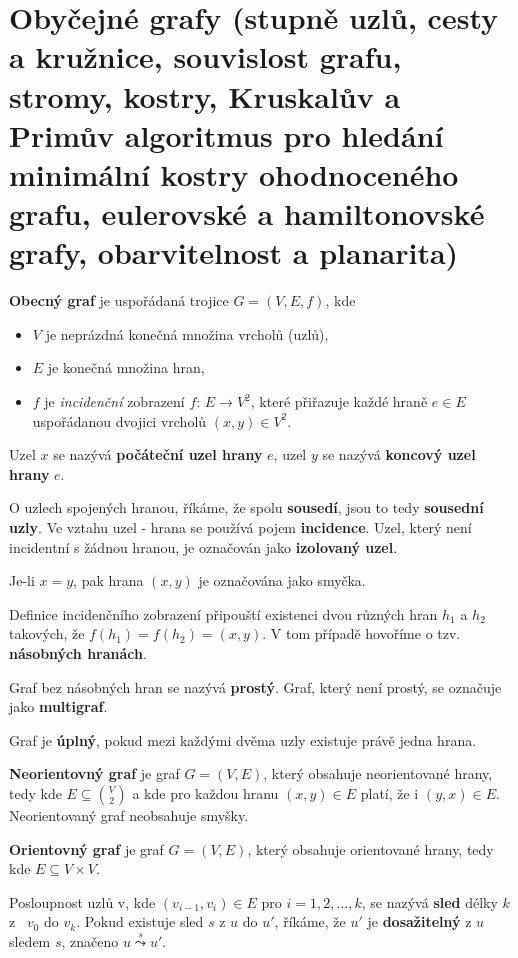 \documentclass[11pt,a4paper]{article}
\begin{document}
\section{Obyčejné grafy (stupně uzlů, cesty a kružnice, souvislost grafu, stromy, kostry, Kruskalův a Primův algoritmus pro hledání minimální kostry ohodnoceného grafu, eulerovské a hamiltonovské grafy, obarvitelnost a planarita)}

\textbf{Obecný graf} je uspořádaná trojice $G = (V, E, f)$, kde
\begin{itemize}
\item $V$ je neprázdná konečná množina vrcholů (uzlů),
\item $E$ je konečná množina hran,
\item $f$ je \textit{incidenční} zobrazení $f$: $E \rightarrow V^2$, které přiřazuje každé hraně $e \in E$ uspořádanou dvojici vrcholů $(x,y) \in V^2$.
\end{itemize}

Uzel $x$ se nazývá \textbf{počáteční uzel hrany} $e$, uzel $y$ se nazývá \textbf{koncový uzel hrany} $e$.

O uzlech spojených hranou, říkáme, že spolu \textbf{sousedí}, jsou to tedy \textbf{sousední uzly}. Ve vztahu uzel - hrana se používá pojem \textbf{incidence}. Uzel, který není incidentní s žádnou hranou, je označován jako \textbf{izolovaný uzel}.

Je-li $x = y$, pak hrana $(x, y)$ je označována jako smyčka.

Definice incidenčního zobrazení připouští existenci dvou různých hran $h_1$ a $h_2$ takových, že $f(h_1) = f(h_2) = (x,y)$. V tom případě hovoříme o tzv. \textbf{násobných hranách}.

Graf bez násobných hran se nazývá \textbf{prostý}. Graf, který není prostý, se označuje jako \textbf{multigraf}. 

Graf je \textbf{úplný}, pokud mezi každými dvěma uzly existuje právě jedna hrana.

\textbf{Neorientovný graf} je graf $G = (V, E)$, který obsahuje neorientované hrany, tedy kde $E \subseteq {V \choose 2}$ a kde pro každou hranu $(x, y) \in E$ platí, že i $(y, x) \in E$. Neorientovaný graf neobsahuje smyšky.

\textbf{Orientovný graf} je graf $G = (V, E)$, který obsahuje orientované hrany, tedy kde $E \subseteq V \times V$.

Posloupnost uzlů v, kde $(v_{i-1}, v_i) \in E$ pro $i = 1,2,\dots,k$, se nazývá \textbf{sled} délky $k$ z \ $v_0$ do $v_k$. Pokud existuje sled $s$ z $u$ do $u'$, říkáme, že $u'$ je \textbf{dosažitelný} z $u$ sledem $s$, značeno $u \overset{s}{\leadsto} u'$.
\end{document}

